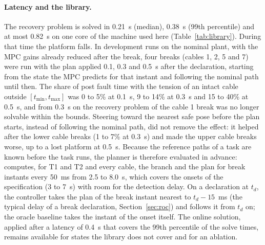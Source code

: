 \documentclass[10pt]{article}
\begin{document}
\paragraph{Latency and the library.} The recovery problem is solved in 0.21~s (median), 0.38~s (99th percentile) and at most 0.82~s on one core of the machine used here (Table~\ref{tab:library}). During that time the platform falls. In development runs on the nominal plant, with the MPC gains already reduced after the break, four breaks (cables 1, 2, 5 and 7) were run with the plan applied 0.1, 0.3 and 0.5~s after the declaration, starting from the state the MPC predicts for that instant and following the nominal path until then. The share of post fault time with the tension of an intact cable outside $[t_{\min},t_{\max}]$ was 0 to 5\% at 0.1~s, 9 to 14\% at 0.3~s and 15 to 40\% at 0.5~s, and from 0.3~s on the recovery problem of the cable 1 break was no longer solvable within the bounds. Steering toward the nearest safe pose before the plan starts, instead of following the nominal path, did not remove the effect: it helped after the lower cable breaks (1 to 7\% at 0.3~s) and made the upper cable breaks worse, up to a lost platform at 0.5~s. Because the reference paths of a task are known before the task runs, the planner is therefore evaluated in advance:  computes, for T1 and T2 and every cable, the branch and the plan for break instants every 50~ms from 2.5 to 8.0~s, which covers the onsets of the specification (3 to 7~s) with room for the detection delay. On a declaration at $t_d$, the controller takes the plan of the break instant nearest to $t_d-15$~ms (the typical delay of a break declaration, Section~\ref{sec:roc}) and follows it from $t_d$ on; the oracle baseline takes the instant of the onset itself. The online solution, applied after a latency of 0.4~s that covers the 99th percentile of the solve times, remains available for states the library does not cover and for an ablation.
\end{document}
